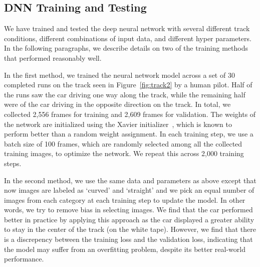
\subsection{DNN Training and Testing}
We have trained and tested the deep neural network with several
different track conditions, different combinations of input
data, and different hyper parameters. In the following paragraphs, we 
describe details on two of the training methods that performed 
reasonably well.

In the first method, we trained the neural network model across a set 
of 30 completed runs on the track seen in Figure~\ref{fig:track2} by a
human pilot. Half of the runs saw the car driving one way along the
track, while the remaining half were of the car driving in the
opposite direction on the track.
In total, we collected 2,556 frames for training and 2,609 
frames for validation.
The weights of the network are initialized using the Xavier
initializer~\cite{Glorot2010}, which is known to perform better
than a random weight assignment.
In each training step, we use a batch
size of 100 frames, which are randomly selected among all the
collected training images, to optimize the network.
We repeat this across 2,000 training steps.

In the second method, we use the same data and parameters as  above 
except that now images are labeled as `curved' and `straight' and we pick an
equal number of images from each category at each training step to
update the model. In other words, we try to remove bias in selecting
images. We find that the car performed better in practice by applying
this approach as the car displayed a greater ability to stay in the
center of the track (on the white tape).
However, we find that there is a discrepency between the training
loss and the validation loss, indicating that the model may suffer
from an overfitting problem, despite its better real-world
performance.


